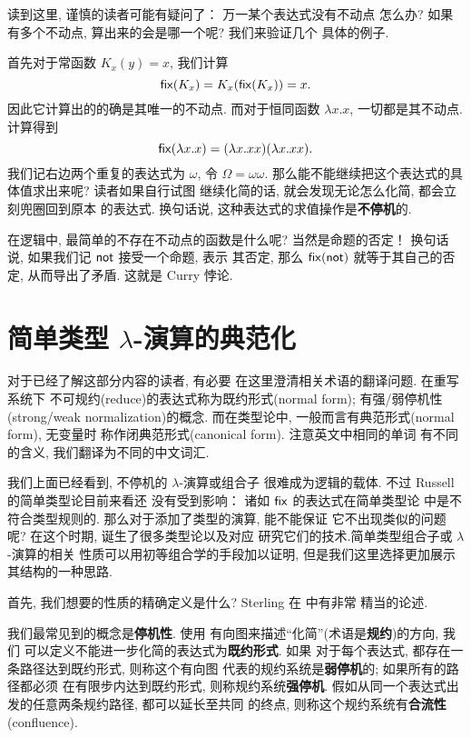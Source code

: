 读到这里, 谨慎的读者可能有疑问了： 万一某个表达式没有不动点
怎么办? 如果有多个不动点, 算出来的会是哪一个呢? 我们来验证几个
具体的例子.

首先对于常函数 \(K_x(y) = x\), 我们计算
\[\textnormal{\textsf{fix}}(K_x) = K_x(\textnormal{\textsf{fix}}(K_x)) = x.\]
因此它计算出的的确是其唯一的不动点. 而对于恒同函数
\(\lambda x. x\), 一切都是其不动点. 计算得到
\[\textnormal{\textsf{fix}}(\lambda x.x) = (\lambda x.xx)(\lambda x.xx).\]
我们记右边两个重复的表达式为 \(\omega\), 令 \(\Omega = \omega\omega\).
那么能不能继续把这个表达式的具体值求出来呢? 读者如果自行试图
继续化简的话, 就会发现无论怎么化简, 都会立刻兜圈回到原本
的表达式. 换句话说, 这种表达式的求值操作是\textbf{不停机}的.

在逻辑中, 最简单的不存在不动点的函数是什么呢? 当然是命题的否定！
换句话说, 如果我们记 \(\textnormal{\textsf{not}}\) 接受一个命题, 表示
其否定, 那么 \(\textnormal{\textsf{fix}}(\textnormal{\textsf{not}})\) 就等于其自己的否定,
从而导出了矛盾. 这就是 Curry 悖论.

\section{简单类型 \texorpdfstring{\(\lambda\)}{Lambda}-演算的典范化}
\label{beginning:ccc}
\begin{center}
\begin{tcolorbox}[text width=0.8\textwidth, title=关于译名]
对于已经了解这部分内容的读者, 有必要
在这里澄清相关术语的翻译问题. 在重写系统下
不可规约(reduce)的表达式称为既约形式(normal form);
有强/弱停机性(strong/weak normalization)的概念.
而在类型论中, 一般而言有典范形式(normal form), 无变量时
称作闭典范形式(canonical form). 注意英文中相同的单词
有不同的含义, 我们翻译为不同的中文词汇.
\end{tcolorbox}
\end{center}

我们上面已经看到, 不停机的 \(\lambda\)-演算或组合子
很难成为逻辑的载体. 不过 Russell 的简单类型论目前来看还
没有受到影响： 诸如 \(\textnormal{\textsf{fix}}\) 的表达式在简单类型论
中是不符合类型规则的. 那么对于添加了类型的演算, 能不能保证
它不出现类似的问题呢? 在这个时期, 诞生了很多类型论以及对应
研究它们的技术.简单类型组合子或 \(\lambda\)-演算的相关
性质可以用初等组合学的手段加以证明\cite{loader:1998:stlc},
但是我们这里选择更加展示其结构的一种思路\cite[\S4.2]{sterling:2021:thesis}.

首先, 我们想要的性质的精确定义是什么? Sterling
在 \cite[\S5.1]{sterling:2021:thesis} 中有非常
精当的论述.

我们最常见到的概念是\textbf{停机性}. 使用
有向图来描述“化简”(术语是\textbf{规约})的方向, 我们
可以定义不能进一步化简的表达式为\textbf{既约形式}. 如果
对于每个表达式, 都存在一条路径达到既约形式, 则称这个有向图
代表的规约系统是\textbf{弱停机}的; 如果所有的路径都必须
在有限步内达到既约形式, 则称规约系统\textbf{强停机}.
假如从同一个表达式出发的任意两条规约路径, 都可以延长至共同
的终点, 则称这个规约系统有\textbf{合流性}(confluence).

